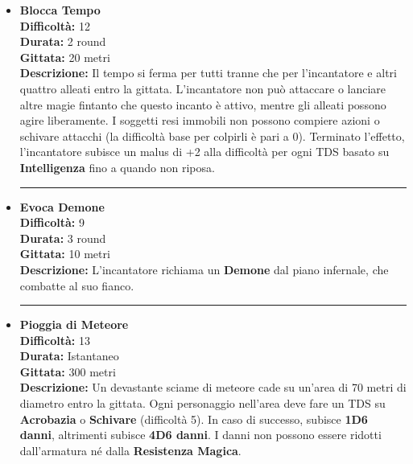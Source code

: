 \documentclass[./magie.tex]{subfiles}
\begin{document}
\begin{itemize}

\item \textbf{Blocca Tempo} \\
\textbf{Difficoltà:} 12 \\
\textbf{Durata:} 2 round \\
\textbf{Gittata:} 20 metri \\
\textbf{Descrizione:} Il tempo si ferma per tutti tranne che per l'incantatore e altri quattro alleati entro la gittata. L'incantatore non può attaccare o lanciare altre magie fintanto che questo incanto è attivo, mentre gli alleati possono agire liberamente. I soggetti resi immobili non possono compiere azioni o schivare attacchi (la difficoltà base per colpirli è pari a 0). Terminato l'effetto, l'incantatore subisce un malus di +2 alla difficoltà per ogni TDS basato su \textbf{Intelligenza} fino a quando non riposa.

\vspace{0.2cm}
\noindent
\begin{center}
\rule{\textwidth}{0.4pt} 
\end{center}
\vspace{0.2cm}

\item \textbf{Evoca Demone} \\
\textbf{Difficoltà:} 9 \\
\textbf{Durata:} 3 round \\
\textbf{Gittata:} 10 metri \\
\textbf{Descrizione:} L'incantatore richiama un \textbf{Demone} dal piano infernale, che combatte al suo fianco.

\vspace{0.2cm}
\noindent
\begin{center}
\rule{\textwidth}{0.4pt} 
\end{center}
\vspace{0.2cm}
\clearpage
\item \textbf{Pioggia di Meteore} \\
\textbf{Difficoltà:} 13 \\
\textbf{Durata:} Istantaneo \\
\textbf{Gittata:} 300 metri \\
\textbf{Descrizione:} Un devastante sciame di meteore cade su un'area di 70 metri di diametro entro la gittata. Ogni personaggio nell'area deve fare un TDS su \textbf{Acrobazia} o \textbf{Schivare} (difficoltà 5). In caso di successo, subisce \textbf{1D6 danni}, altrimenti subisce \textbf{4D6 danni}. I danni non possono essere ridotti dall'armatura né dalla \textbf{Resistenza Magica}.


\end{itemize}
\end{document}
